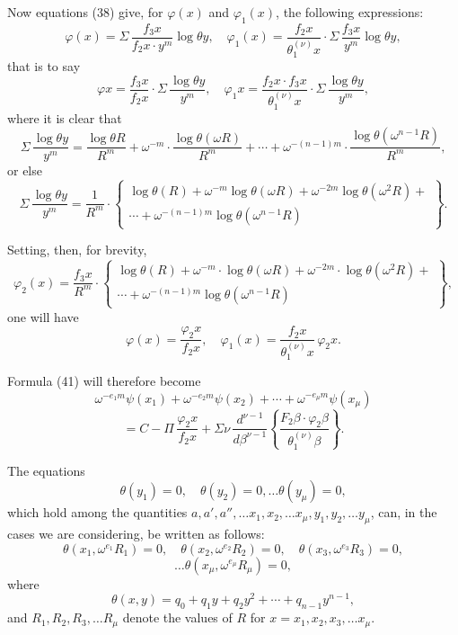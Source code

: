 \documentclass{article}
\begin{document}
Now equations (38) give, for $\varphi(x)$ and $\varphi_1(x)$, the following expressions:
\[ \varphi(x) = \Sigma\,\frac{f_3 x}{f_2 x \cdot y^{m}}\log\theta y, \quad \varphi_1(x) = \frac{f_2 x}{\theta_1^{(\nu)} x} \cdot \Sigma\,\frac{f_3 x}{y^{m}}\log\theta y, \]
that is to say
\[ \varphi x = \frac{f_3 x}{f_2 x} \cdot \Sigma\,\frac{\log\theta y}{y^{m}}, \quad \varphi_1 x = \frac{f_2 x \cdot f_3 x}{\theta_1^{(\nu)} x} \cdot \Sigma\,\frac{\log\theta y}{y^{m}}, \]
where it is clear that
\[ \Sigma\,\frac{\log\theta y}{y^{m}} = \frac{\log\theta R}{R^{m}} + \omega^{-m} \cdot \frac{\log\theta(\omega R)}{R^{m}} + \cdots + \omega^{-(n-1)m} \cdot \frac{\log\theta(\omega^{n-1}R)}{R^{m}}, \]
or else
\[ \Sigma\,\frac{\log\theta y}{y^{m}} = \frac{1}{R^{m}} \cdot \left\{ \begin{array}{l} \log\theta(R)+\omega^{-m}\log\theta(\omega R)+\omega^{-2m}\log\theta(\omega^{2}R)+ \\ \cdots+\omega^{-(n-1)m}\log\theta(\omega^{n-1}R) \end{array} \right\}. \]

Setting, then, for brevity,
\[ \varphi_2(x) = \frac{f_3 x}{R^{m}} \cdot \left\{ \begin{array}{l} \log\theta(R)+\omega^{-m} \cdot \log\theta(\omega R)+\omega^{-2m} \cdot \log\theta(\omega^{2}R)+ \\ \cdots+\omega^{-(n-1)m}\log\theta(\omega^{n-1}R) \end{array} \right\}, \tag{132} \]
one will have
\[ \varphi(x) = \frac{\varphi_2 x}{f_2 x}, \quad \varphi_1(x) = \frac{f_2 x}{\theta_1^{(\nu)} x}\,\varphi_2 x. \tag{133} \]

Formula (41) will therefore become
\[ \omega^{-e_1 m}\psi(x_1) + \omega^{-e_2 m}\psi(x_2) + \cdots + \omega^{-e_\mu m}\psi(x_\mu) \]
\[ = C - \Pi\,\frac{\varphi_2 x}{f_2 x} + \Sigma\nu\,\frac{d^{\nu-1}}{d\beta^{\nu-1}} \left\{ \frac{F_2\beta \cdot \varphi_2\beta}{\theta_1^{(\nu)}\beta} \right\}. \tag{134} \]

The equations
\[ \theta(y_1) = 0, \quad \theta(y_2) = 0, \ldots \theta(y_\mu) = 0, \]
which hold among the quantities $a, a', a'', \ldots x_1, x_2, \ldots x_\mu, y_1, y_2, \ldots y_\mu$,
can, in the cases we are considering, be written as follows:
\[ \theta(x_1, \omega^{e_1}R_1) = 0, \quad \theta(x_2, \omega^{e_2}R_2) = 0, \quad \theta(x_3, \omega^{e_3}R_3) = 0, \]
\[ \ldots \theta(x_\mu, \omega^{e_\mu}R_\mu) = 0, \]
where
\[ \theta(x, y) = q_0 + q_1 y + q_2 y^{2} + \cdots + q_{n-1} y^{n-1}, \]
and $R_1, R_2, R_3, \ldots R_\mu$ denote the values of $R$ for $x = x_1, x_2, x_3, \ldots x_\mu$.
\end{document}
